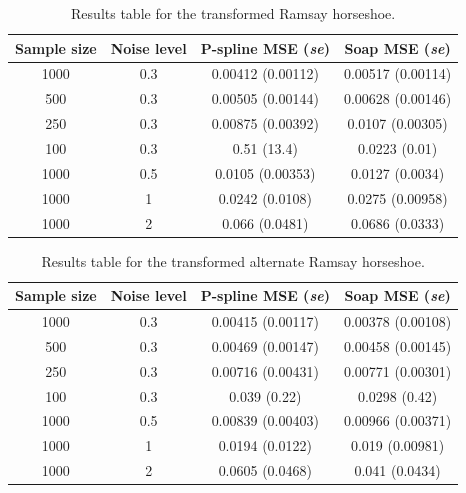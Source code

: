 \documentclass[a4paper,10pt]{amsart}
\begin{document}
\begin{table}[ht]
\begin{tabular}{c c c c}\\
Sample size & Noise level & P-spline MSE (\emph{se}) & Soap MSE (\emph{se}) \\
\hline
\hline
1000 & 0.3 & 0.00412 (0.00112) & 0.00517 (0.00114) \\ 
500 & 0.3 & 0.00505 (0.00144) & 0.00628 (0.00146) \\ 
250 & 0.3 & 0.00875 (0.00392) & 0.0107 (0.00305) \\ 
100 & 0.3 & 0.51 (13.4) & 0.0223 (0.01) \\ 
1000 & 0.5 & 0.0105 (0.00353) & 0.0127 (0.0034) \\ 
1000 & 1 & 0.0242 (0.0108) & 0.0275 (0.00958) \\ 
1000 & 2 & 0.066 (0.0481) & 0.0686 (0.0333) \\ 
\end{tabular}
\label{ramsaytresultstable}
\caption{Results table for the transformed Ramsay horseshoe.}
\end{table}


\begin{table}[ht]
\begin{tabular}{c c c c}\\
Sample size & Noise level & P-spline MSE (\emph{se}) & Soap MSE (\emph{se}) \\
\hline
\hline
1000 & 0.3 & 0.00415 (0.00117) & 0.00378 (0.00108) \\ 
500 & 0.3 & 0.00469 (0.00147) & 0.00458  (0.00145) \\ 
250 & 0.3 & 0.00716 (0.00431) & 0.00771  (0.00301) \\ 
100 & 0.3 & 0.039 (0.22) & 0.0298  (0.42) \\ 
1000 & 0.5 & 0.00839 (0.00403) & 0.00966 (0.00371) \\ 
1000 & 1 & 0.0194 (0.0122) & 0.019 (0.00981) \\ 
1000 & 2 & 0.0605 (0.0468) & 0.041 (0.0434) \\ 
\end{tabular}
\label{ramsatresultstable}
\caption{Results table for the transformed alternate Ramsay horseshoe.}
\end{table}





\end{document}
